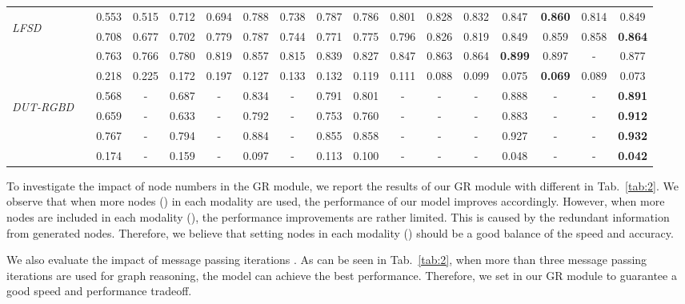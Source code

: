 \documentclass[runningheads]{llncs}
\begin{document}
\begin{table}[pt]
{\begin{tabular}{lr|ccccc|ccccccccc|c}
			\multirow{4}{*}{\begin{sideways}\textit{LFSD}\end{sideways}}
			&  &0.553& 0.515 & 0.712 & 0.694 & 0.788 & 0.738 & 0.787  & 0.786 & 0.801 & 0.828 & 0.832 &0.847 &{\bf 0.860}&0.814& 0.849 \\
			&  &0.708& 0.677 & 0.702 & 0.779 & 0.787 & 0.744 & 0.771  & 0.775   & 0.796 & 0.826 & 0.819 &0.849 &0.859&0.858& {\bf 0.864} \\
			&  &0.763& 0.766 & 0.780 & 0.819 & 0.857 & 0.815 & 0.839  & 0.827   & 0.847 & 0.863 & 0.864 &{\bf0.899} &0.897&-&  0.877 \\
			&  &0.218& 0.225 & 0.172 & 0.197 & 0.127 & 0.133 & 0.132  & 0.119   & 0.111 & 0.088 & 0.099 &0.075 &{\bf 0.069}&0.089& 0.073 \\
			\midrule
			
			
			\multirow{4}{*}{\begin{sideways}\textit{DUT-RGBD}\end{sideways}}
			&  &0.568& - & 0.687 &- & 0.834 & - & 0.791  & 0.801 & - & - & - &0.888 &-&-& {\bf 0.891} \\
			&  &0.659& - & 0.633 &- & 0.792 & - & 0.753  & 0.760   & - & - & - &0.883 &-&-& {\bf 0.912} \\
			&  &0.767&- & 0.794 &- & 0.884 & - & 0.855  & 0.858   & - & - & - &0.927 &-&-&  {\bf 0.932} \\
			&  &0.174&- & 0.159 & - & 0.097 & - & 0.113  & 0.100 & - & - & - &0.048 &-&-& {\bf0.042} \\
			\midrule
			
			
			\hline
		\end{tabular}
		\label{tab:3}
	}
\end{table}

 To investigate the impact of node numbers  in the GR module, we report the results of our GR module with different  in Tab.~\ref{tab:2}. We observe that when more nodes () in each modality are used, the performance of our model improves accordingly. However, when more nodes are included in each modality (), the performance improvements are rather limited. This is caused by the redundant information from generated nodes. Therefore, we believe that setting  nodes in each modality () should be a good balance of the speed and accuracy.  

 We also evaluate the impact of message passing iterations . As can be seen in Tab.~\ref{tab:2}, when more than three message passing iterations are used for graph reasoning, the model can achieve the best performance. Therefore, we set  in our GR module to guarantee a good speed and performance tradeoff.  
\end{document}
